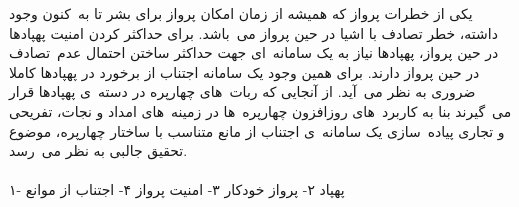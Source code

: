 
\iffalse
چهارپره\زیرنویس{\lr{Quadrotor, Quadcopter}} از دسته پهباد\زیرنویس{\lr{Unmanned Aerial Vehicle (UAV)}}های چندپروانه\ ای می\ باشد که توسط ۴ عدد پره\زیرنویس{\lr{Propeller}} به پرواز درآورده می\ شود. کنترل چهارپره توسط سرعت\ های چرخش ۴ پره\ ی آن صورت می\ گیرد که جهت خنثی کردن نیروی گشتاوری تحمیلی توسط پره\ ها به بدنه\ ی چهارپره ۲ عدد از پره\ ها در جهت عقربه\ های ساعت و ۲ عدد دیگر در خلاف جهت عقربه\ های ساعت می\ چرخند. و در کل با تنظیم مناسب سرعت\ های چرخش هریک از این پره\ ها در جهت\ های چرخشی از پیش تعیین آن\ ها می\ توان جهت و سرعت حرکت چهارپره را کنترل کرد.\بند
\fi
یکی از خطرات پرواز که همیشه از زمان امکان پرواز برای بشر تا به\ کنون وجود داشته، خطر تصادف با اشیا در حین پرواز می\ باشد.
برای حداکثر کردن امنیت پهپادها در حین پرواز، پهپادها نیاز به یک سامانه\ ای جهت حداکثر ساختن احتمال عدم\ تصادف در حین پرواز دارند. برای همین وجود یک سامانه اجتناب از برخورد در پهپادها کاملا ضروری به نظر می\ آید. از آنجایی که ربات\ های چهارپره در دسته\ ی پهپادها قرار می\ گیرند بنا به کاربرد\ های روزافزون چهارپره\ ها در زمینه\ های امداد و نجات، تفریحی و تجاری پیاده\ سازی یک سامانه\ ی اجتناب از مانع متناسب با ساختار چهارپره، موضوع تحقیق جالبی به نظر می\ رسد.\\\\
 ۱- پهپاد ۲- پرواز خودکار ۳- امنیت پرواز ۴- اجتناب از موانع